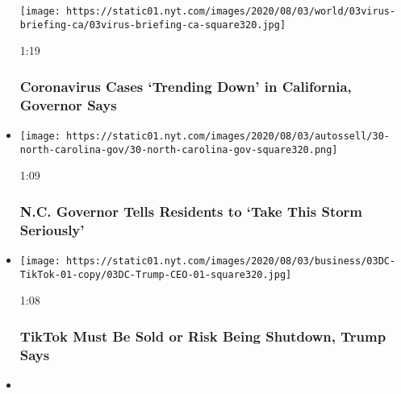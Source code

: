 \begin{itemize}
  \texttt{[image: https://static01.nyt.com/images/2020/08/03/world/03virus-briefing-ca/03virus-briefing-ca-square320.jpg]}

  1:19

  \hypertarget{coronavirus-cases-trending-down-in-california-governor-says}{%
  \subsubsection{Coronavirus Cases `Trending Down' in California,
  Governor
  Says}\label{coronavirus-cases-trending-down-in-california-governor-says}}
\item
  \href{https://www.nytimes.com/video/us/100000007271090/north-carolina-isaias-coronavirus.html?action=click\&module=video-series-bar\&region=header\&pgtype=Article\&playlistId=video/u-s}{}

  \texttt{[image: https://static01.nyt.com/images/2020/08/03/autossell/30-north-carolina-gov/30-north-carolina-gov-square320.png]}

  1:09

  \hypertarget{nc-governor-tells-residents-to-take-this-storm-seriously}{%
  \subsubsection{N.C. Governor Tells Residents to `Take This Storm
  Seriously'}\label{nc-governor-tells-residents-to-take-this-storm-seriously}}
\item
  \href{https://www.nytimes.com/video/us/100000007270771/trump-tiktok-shutdown-microsoft.html?action=click\&module=video-series-bar\&region=header\&pgtype=Article\&playlistId=video/u-s}{}

  \texttt{[image: https://static01.nyt.com/images/2020/08/03/business/03DC-TikTok-01-copy/03DC-Trump-CEO-01-square320.jpg]}

  1:08

  \hypertarget{tiktok-must-be-sold-or-risk-being-shutdown-trump-says}{%
  \subsubsection{TikTok Must Be Sold or Risk Being Shutdown, Trump
  Says}\label{tiktok-must-be-sold-or-risk-being-shutdown-trump-says}}
\item
  \href{https://www.nytimes.com/video/us/100000007269993/judge-salas-new-jersey.html?action=click\&module=video-series-bar\&region=header\&pgtype=Article\&playlistId=video/u-s}{}


\end{itemize}
